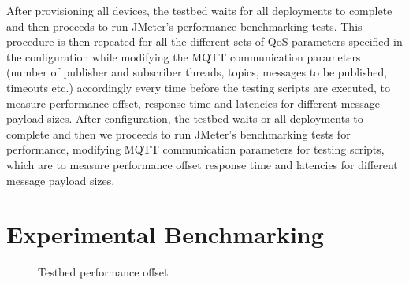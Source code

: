 \documentclass[conference]{IEEEtran}
\begin{document}
After provisioning all devices, the testbed waits for all deployments to complete and then  proceeds to run JMeter's performance benchmarking tests. This procedure is then repeated for all the different sets of QoS parameters
specified in the configuration while modifying the MQTT communication parameters (number of publisher and subscriber threads, topics, messages to be published, timeouts etc.) accordingly every time before the testing scripts are executed, to
measure performance offset, response time and latencies for different message payload sizes. After configuration, the testbed waits or all deployments to complete and then we proceeds to run JMeter's benchmarking tests for performance, modifying MQTT communication parameters for testing scripts, which are to measure performance offset  response time and latencies for different message payload sizes. 

\section{Experimental Benchmarking}

\begin{figure}[!t]
    \centering
    \hfil \hfil
    \caption{Testbed performance offset}
\end{figure}
\end{document}
